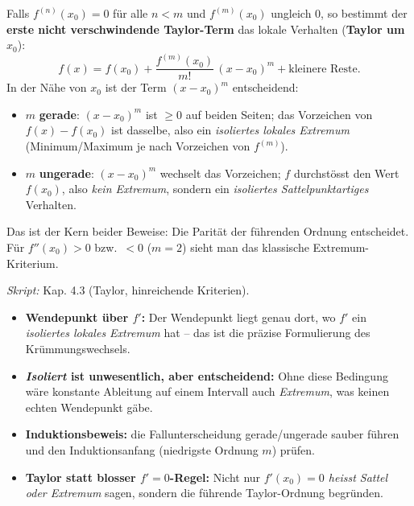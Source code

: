 \begin{werkzeugkasten}
Falls $f^{(n)}(x_0)=0$ für alle $n<m$ und $f^{(m)}(x_0)$ ungleich $0$, so
bestimmt der \textbf{erste nicht verschwindende Taylor-Term} das lokale
Verhalten (\textbf{Taylor um} $x_0$):
\begin{equation*}
  f(x)=f(x_0)+\frac{f^{(m)}(x_0)}{m!}\,(x-x_0)^m + \text{kleinere Reste}.
\end{equation*}
In der Nähe von $x_0$ ist der Term $(x-x_0)^m$ entscheidend:
\begin{itemize}
  \item $m$ \textbf{gerade}: $(x-x_0)^m$ ist $\geq0$ auf beiden Seiten;
        das Vorzeichen von $f(x)-f(x_0)$ ist dasselbe, also ein
        \emph{isoliertes lokales Extremum} (Minimum/Maximum je nach
        Vorzeichen von $f^{(m)}$).
  \item $m$ \textbf{ungerade}: $(x-x_0)^m$ wechselt das Vorzeichen; $f$
        durchstösst den Wert $f(x_0)$, also \emph{kein Extremum}, sondern
        ein \emph{isoliertes Sattelpunktartiges} Verhalten.
\end{itemize}
Das ist der Kern beider Beweise: Die Parität der führenden Ordnung
entscheidet. Für $f''(x_0)>0$ bzw.\ $<0$ ($m=2$) sieht man das klassische
Extremum-Kriterium.

\textit{Skript:} Kap. 4.3 (Taylor, hinreichende Kriterien).
\end{werkzeugkasten}

\begin{achtung}
\begin{itemize}
  \item \textbf{Wendepunkt über $f'$:} Der Wendepunkt liegt genau dort, wo
        $f'$ ein \emph{isoliertes lokales Extremum} hat -- das ist die
        präzise Formulierung des Krümmungswechsels.
  \item \textbf{\emph{Isoliert} ist unwesentlich, aber entscheidend:} Ohne
        diese Bedingung wäre konstante Ableitung auf einem Intervall auch
        \emph{Extremum}, was keinen echten Wendepunkt gäbe.
  \item \textbf{Induktionsbeweis:} die Fallunterscheidung gerade/ungerade
        sauber führen und den Induktionsanfang (niedrigste Ordnung $m$)
        prüfen.
  \item \textbf{Taylor statt blosser \emph{$f'=0$}-Regel:} Nicht nur
        \emph{$f'(x_0)=0$ heisst Sattel oder Extremum} sagen, sondern die
        führende Taylor-Ordnung begründen.
\end{itemize}
\end{achtung}
